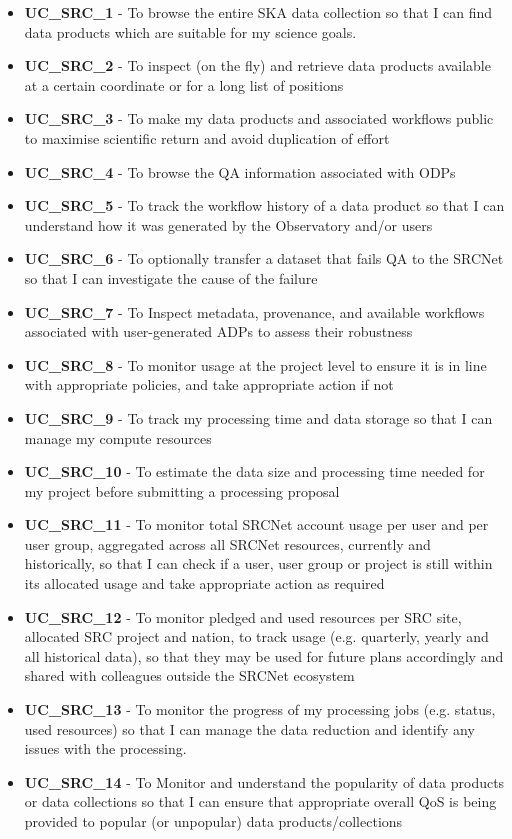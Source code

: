 \begin{itemize}[label={}]
    \item {\bf UC\_SRC\_1} - To browse the entire SKA data collection so that I can find data products which are suitable for my science goals.
    \item {\bf UC\_SRC\_2} - To inspect (on the fly) and retrieve data products available at a certain coordinate or for a long list of positions
    \item {\bf UC\_SRC\_3} - To make my data products and associated workflows public to maximise scientific return and avoid duplication of effort
    \item {\bf UC\_SRC\_4} - To browse the QA information associated with ODPs
    \item {\bf UC\_SRC\_5} - To track the workflow history of a data product so that I can understand how it was generated by the Observatory and/or users
    \item {\bf UC\_SRC\_6} - To optionally transfer a dataset that fails QA to the SRCNet so that I can investigate the cause of the failure
    \item {\bf UC\_SRC\_7} - To Inspect metadata, provenance, and available workflows associated with user-generated ADPs to assess their robustness
    \item {\bf UC\_SRC\_8} - To monitor usage at the project level to ensure it is in line with appropriate policies, and take appropriate action if not
    \item {\bf UC\_SRC\_9} - To track my processing time and data storage so that I can manage my compute resources
    \item {\bf UC\_SRC\_10} - To estimate the data size and processing time needed for my project before submitting a processing proposal
    \item {\bf UC\_SRC\_11} - To monitor total SRCNet account usage per user and per user group, aggregated across all SRCNet resources, currently and historically, so that I can check if a user, user group or project is still within its allocated usage and take appropriate action as required
    \item {\bf UC\_SRC\_12} - To monitor pledged and used resources per SRC site, allocated SRC project and nation, to track usage (e.g. quarterly, yearly and all historical data), so that they may be used for future plans accordingly and shared with colleagues outside the SRCNet ecosystem
    \item {\bf UC\_SRC\_13} - To monitor the progress of my processing jobs (e.g. status, used resources) so that I can manage the data reduction and identify any issues with the processing.
    \item {\bf UC\_SRC\_14} - To Monitor and understand the popularity of data products or data collections so that I can ensure that appropriate overall QoS is being provided to popular (or unpopular) data products/collections
\end{itemize}

